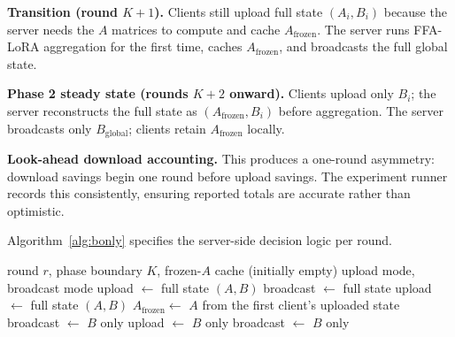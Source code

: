 \textbf{Transition (round $K{+}1$).}
Clients still upload full state $(A_i, B_i)$ because the server needs the $A$ matrices to compute and cache $A_{\text{frozen}}$. The server runs FFA-LoRA \cite{sun2024ffalora} aggregation for the first time, caches $A_{\text{frozen}}$, and broadcasts the full global state.

\textbf{Phase 2 steady state (rounds $K{+}2$ onward).}
Clients upload only $B_i$; the server reconstructs the full state as $(A_{\text{frozen}}, B_i)$ before aggregation. The server broadcasts only $B_{\text{global}}$; clients retain $A_{\text{frozen}}$ locally.

\textbf{Look-ahead download accounting.}
This produces a one-round asymmetry: download savings begin one round before upload savings. The experiment runner records this consistently, ensuring reported totals are accurate rather than optimistic.

Algorithm~\ref{alg:bonly} specifies the server-side decision logic per round.

\begin{algorithm}[t]
\caption{Bidirectional B-only protocol (server, per round)}
\label{alg:bonly}
\footnotesize
\begin{algorithmic}[1]
\Require round $r$, phase boundary $K$, frozen-$A$ cache (initially empty)
\Ensure upload mode, broadcast mode
 
    \State upload $\leftarrow$ full state $(A, B)$
    \State broadcast $\leftarrow$ full state
 
    \State upload $\leftarrow$ full state $(A, B)$
    \State $A_{\text{frozen}} \leftarrow$ $A$ from the first client's uploaded state
    \State broadcast $\leftarrow$ $B$ only 
\Else {}
    \State upload $\leftarrow$ $B$ only 
    \State broadcast $\leftarrow$ $B$ only 
\EndIf
\end{algorithmic}
\end{algorithm}

